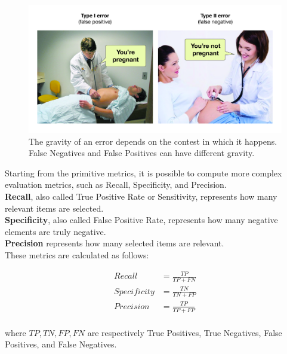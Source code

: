 \begin{figure}[h]
    \centering
    \includegraphics[width=0.9\linewidth]{images/results/bin_type_errors.jpeg}
    \caption{The gravity of an error depends on the contest in which it happens. False Negatives and False Positives can have different gravity.}
    \label{fig:bin-errors}
\end{figure}

Starting from the primitive metrics, it is possible to compute more complex evaluation metrics, such as Recall, Specificity, and Precision.\\
\textbf{Recall}, also called True Positive Rate or Sensitivity, represents how many relevant items are selected.\\
\textbf{Specificity}, also called False Positive Rate, represents how many negative elements are truly negative.\\
\textbf{Precision} represents how many selected items are relevant.\\
These metrics are calculated as follows:

\begin{equation}
    \begin{aligned}
    Recall &= \frac{TP}{TP + FN}\\[10pt]
    Specificity &= \frac{TN}{TN + FP}\\[10pt]
    Precision &= \frac{TP}{TP + FP}\\[10pt]
    \end{aligned}
\end{equation}

where $TP, TN, FP, FN$ are respectively True Positives, True Negatives, False Positives, and False Negatives.

